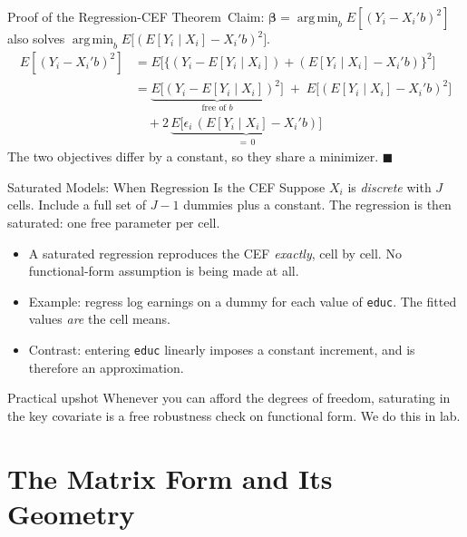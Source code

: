 \documentclass[aspectratio=169,11pt,xcolor=dvipsnames]{beamer}
\DeclareMathOperator*{\argmin}{arg\,min}
\newcommand{\E}{E}
\newcommand{\adv}{\,\raisebox{0.6pt}{\textcolor{accent}{$\bigstar$}}}
\begin{document}
\begin{frame}{Proof of the Regression-CEF Theorem\adv}
Claim: $\bm\beta = \argmin_b \E[(Y_i - X_i'b)^2]$ also solves
$\argmin_b \E\big[(\E[Y_i\mid X_i] - X_i'b)^2\big]$.
\begin{align*}
  \E[(Y_i - X_i'b)^2]
  &= \E\Big[\big\{ (Y_i - \E[Y_i\mid X_i]) + (\E[Y_i\mid X_i] - X_i'b)\big\}^2 \Big] \\
  &= \underbrace{\E\big[(Y_i - \E[Y_i\mid X_i])^2\big]}_{\text{free of } b}
  \;+\; \E\big[(\E[Y_i\mid X_i] - X_i'b)^2\big] \\
  &\quad + 2\,\underbrace{\E\big[\epsilon_i\,(\E[Y_i\mid X_i] - X_i'b)\big]}_{=\,0}
\end{align*}
The two objectives differ by a constant, so they share a minimizer.
$\blacksquare$
\end{frame}

\begin{frame}{Saturated Models: When Regression Is the CEF}
Suppose $X_i$ is \emph{discrete} with $J$ cells. Include a full set of $J-1$
dummies plus a constant. The regression is then \alert{saturated}: one free
parameter per cell.
\vskip6pt
\begin{itemize}\itemsep4pt
  \item A saturated regression reproduces the CEF \emph{exactly}, cell by cell.
        No functional-form assumption is being made at all.
  \item Example: regress log earnings on a dummy for each value of \texttt{educ}.
        The fitted values \emph{are} the cell means.
  \item Contrast: entering \texttt{educ} linearly imposes a constant increment,
        and is therefore an approximation.
\end{itemize}
\vskip4pt
\begin{block}{Practical upshot}
Whenever you can afford the degrees of freedom, saturating in the key covariate
is a free robustness check on functional form. We do this in lab.
\end{block}
\end{frame}

\section[Matrix Form]{The Matrix Form and Its Geometry}
\begin{frame}\sectionpage\end{frame}
\end{document}
